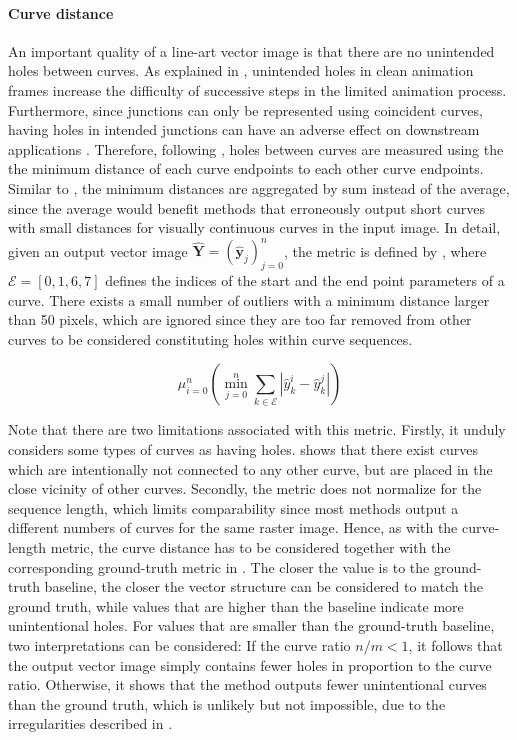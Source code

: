 \paragraph{Curve distance}
An important quality of a line-art vector image is that there are no unintended holes between curves. As explained in , unintended holes in clean animation frames increase the difficulty of successive steps in the limited animation process. Furthermore, since junctions can only be represented using coincident curves, having holes in intended junctions can have an adverse effect on downstream applications \citep{Yan:2020:ABR}. Therefore, following \citet{Yan:2020:ABR}, holes between curves are measured using the the minimum distance of each curve endpoints to each other curve endpoints. Similar to \citet{Yan:2020:ABR}, the minimum distances are aggregated by sum instead of the average, since the average would benefit methods that erroneously output short curves with small distances for visually continuous curves in the input image. In detail, given an output vector image $\hat{\mathbf{Y}}=(\hat{\mathbf{y}}_j)_{j=0}^n$, the metric is defined by , where $\mathcal{E}=[0,1,6,7]$ defines the indices of the start and the end point parameters of a curve. There exists a small number of outliers with a minimum distance larger than 50 pixels, which are ignored since they are too far removed from other curves to be considered constituting holes within curve sequences.

\begin{equation}
\label{eq:holes.distance}
    \mu_{i=0}^n \left( \min_{j=0}^n \sum_{k\in\mathcal{E}} |\hat{y}_k^i - \hat{y}_k^j| \right)
\end{equation}

Note that there are two limitations associated with this metric. Firstly, it unduly considers some types of curves as having holes.  shows that there exist curves which are intentionally not connected to any other curve, but are placed in the close vicinity of other curves. Secondly, the metric does not normalize for the sequence length, which limits comparability since most methods output a different numbers of curves for the same raster image. Hence, as with the curve-length metric, the curve distance has to be considered together with the corresponding ground-truth metric in . The closer the value is to the ground-truth baseline, the closer the vector structure can be considered to match the ground truth, while values that are higher than the baseline indicate more unintentional holes. For values that are smaller than the ground-truth baseline, two interpretations can be considered: If the curve ratio $n/m<1$, it follows that the output vector image simply contains fewer holes in proportion to the curve ratio. Otherwise, it shows that the method outputs fewer unintentional curves than the ground truth, which is unlikely but not impossible, due to the irregularities described in .

